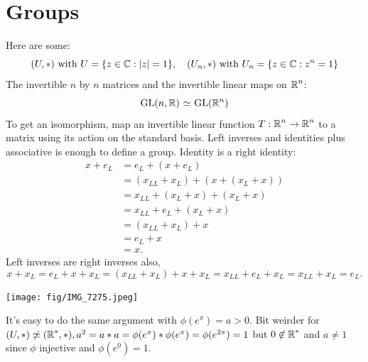 \section*{Groups}
Here are some:
$$
(U, *) \text{ with } U = \{ z \in \operatorname{\mathbb{C}}: |z| = 1 \}, \quad \text{$(U_n,*)$ with } U_n = \{ z \in \operatorname{\mathbb{C}}: z^n = 1\}
$$
The invertible $n$ by $n$ matrices and the invertible linear maps on $\operatorname{\mathbb{R}}^n$:
$$
\text{GL}(n,\mathbb{R}) \operatorname{\,\simeq\,} \text{GL}(\mathbb{R}^n)
$$
To get an isomorphism, map an invertible linear function $T: \operatorname{\mathbb{R}}^n \to \operatorname{\mathbb{R}}^n$ to a matrix using its action on the standard basis.
Left inverses and identities plus associative is enough to define a group.
Identity is a right identity:
\begin{align*}
x + e_L &= e_L + (x + e_L)  \\ &= (x_{LL} + x_L) + (x + (x_L+x)) \\ &= x_{LL} + (x_L+x) + (x_L+x) \\ &=
x_{LL} + e_L + (x_L+x) \\ &= (x_{LL}+x_L)+x \\ &= e_L + x \\ &= x.
\end{align*}
Left inverses are right inverses also,
$$
x + x_L = e_L + x+ x_L = (x_{LL}+x_L) + x + x_L = x_{LL}+e_L+x_L = x_{LL} + x_L = e_L.
$$
\begin{center}
\texttt{[image: fig/IMG\_7275.jpeg]}
\end{center}
It's easy to do the same argument with $\phi(e^\pi) = a > 0$.
Bit weirder for $(U,*) \not \simeq (\operatorname{\mathbb{R}}^*,*), a^2 = a * a = \phi(e^\pi) * \phi(e^\pi) = \phi(e^{2\pi}) = 1$ but $0 \not \in \operatorname{\mathbb{R}}^*$ and $a \neq 1$ since $\phi$ injective and $\phi(e^0) = 1$.
